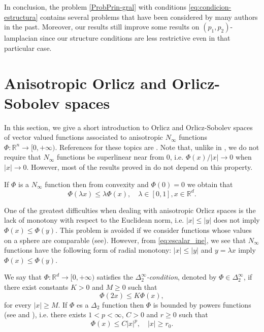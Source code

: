 \documentclass[twoside]{article}
\theoremstyle{remark}
\newcommand{\rr}{\mathbb{R}}
\renewcommand{\leq}{\leqslant}
\renewcommand{\geq}{\geqslant}
\begin{document}
In conclusion, the problem \eqref{ProbPrin-gral} with conditions \eqref{eq:condicion-estructura}  contains several problems that have been considered by many authors in the past. 
Moreover, our results still improve some results on $(p_1,p_2)$-lamplacian since our structure conditions are less restrictive even in that particular case. 

\section{Anisotropic Orlicz and Orlicz-Sobolev spaces}\label{preliminares}

In this section, we give a short introduction to  Orlicz and Orlicz-Sobolev spaces of vector valued functions associated to anisotropic $N_{\infty}$ functions $\Phi:\rr^n\to[0,+\infty)$.  References for  these topics are \cite{Desch2001,Orliczvectorial2005,Skaff1969,cianchi2000fully,cianchi2004optimal,chamra2017anisotropic,trudinger1974imbedding,gwiazda2013anisotropic}.
Note that, unlike in \cite{gwiazda2013anisotropic}, we do not require that $N_{\infty}$ functions be superlinear near from 0, i.e. $\Phi(x)/|x|\to 0$ when $|x|\to 0$. However, most of the results proved in \cite{gwiazda2013anisotropic} do not depend on this property.

If $\Phi$  is a $N_{\infty}$ function then from convexity and $\Phi(0)=0$ we obtain that
\begin{equation}\label{eq:escalar_ine}
 \Phi(\lambda x)\leq \lambda\Phi(x),\quad \lambda\in[0,1],x\in\rr^d.
\end{equation}

One of the greatest difficulties when dealing with anisotropic Orlicz spaces is the lack of  monotony  with respect to the Euclidean norm, i.e. $|x|\leq |y|$ does not imply $\Phi(x)\leq\Phi(y)$. This problem is avoided if we consider functions whose values on a sphere are comparable (see\cite{Skaff1969}). However, from \eqref{eq:escalar_ine}, we see that  $N_{\infty}$ functions have the following form of radial monotony: $|x|\leq |y|$ and $y=\lambda x$ imply $\Phi(x)\leq\Phi(y)$. 

We say that  $\Phi:\mathbb{R}^d\rightarrow [0,+\infty)$ satisfies the  \emph{$\Delta_2^{\infty}$-condition}, denoted by $\Phi \in \Delta_2^{\infty}$,
if there exist  constants $K>0$ and  $M\geq 0$ such that
\begin{equation}\label{delta2defi}\Phi(2x)\leq K \Phi(x),
\end{equation}
for every $|x|\geq M$. If $\Phi$ es a $\Delta_2$ function then $\Phi$ is bounded by powers functions (see \cite[Proof Lemma 2.4]{Desch2001} and \cite[Prop. 1]{cianchi2000local}), i.e. there exists $1<p<\infty$, $C>0$ and $r\geq 0$ such that
\[\Phi(x)\leq C|x|^p,\quad |x|\geq r_0.\] 
\end{document}
